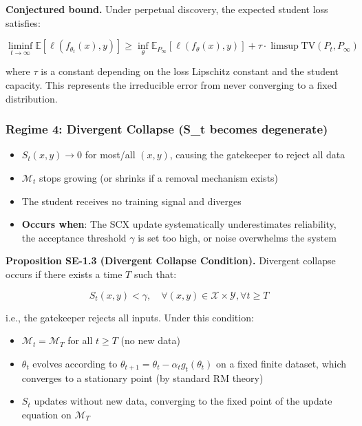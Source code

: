 \documentclass[
  12pt,
]{article}
\providecommand{\tightlist}{%
  \setlength{\itemsep}{0pt}\setlength{\parskip}{0pt}}
\begin{document}
\textbf{Conjectured bound.} Under perpetual discovery, the expected
student loss satisfies:

\[
\liminf_{t \to \infty} \mathbb{E}[\ell(f_{\theta_t}(x), y)] \geq \inf_{\theta} \mathbb{E}_{P_\infty}[\ell(f_\theta(x), y)] + \tau \cdot \limsup \text{TV}(P_t, P_\infty)
\]

where \(\tau\) is a constant depending on the loss Lipschitz constant
and the student capacity. This represents the irreducible error from
never converging to a fixed distribution.

\subsubsection{Regime 4: Divergent Collapse (S\_t becomes
degenerate)}\label{regime-4-divergent-collapse-s_t-becomes-degenerate}

\begin{itemize}
\tightlist
\item
  \(S_t(x,y) \to 0\) for most/all \((x,y)\), causing the gatekeeper to
  reject all data
\item
  \(\mathcal{M}_t\) stops growing (or shrinks if a removal mechanism
  exists)
\item
  The student receives no training signal and diverges
\item
  \textbf{Occurs when}: The SCX update systematically underestimates
  reliability, the acceptance threshold \(\gamma\) is set too high, or
  noise overwhelms the system
\end{itemize}

\textbf{Proposition SE-1.3 (Divergent Collapse Condition).} Divergent
collapse occurs if there exists a time \(T\) such that:

\[
S_t(x,y) < \gamma, \quad \forall (x,y) \in \mathcal{X} \times \mathcal{Y}, \forall t \geq T
\]

i.e., the gatekeeper rejects all inputs. Under this condition:

\begin{itemize}
\tightlist
\item
  \(\mathcal{M}_t = \mathcal{M}_T\) for all \(t \geq T\) (no new data)
\item
  \(\theta_t\) evolves according to
  \(\theta_{t+1} = \theta_t - \alpha_t g_t(\theta_t)\) on a fixed finite
  dataset, which converges to a stationary point (by standard RM theory)
\item
  \(S_t\) updates without new data, converging to the fixed point of the
  update equation on \(\mathcal{M}_T\)
\end{itemize}
\end{document}
